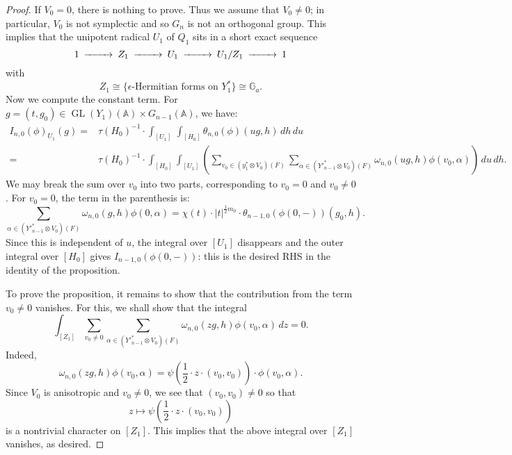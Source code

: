 \documentclass[10pt]{amsart}
\theoremstyle{plain}
\numberwithin{equation}{section}
\begin{document}
 \begin{proof}
 If $V_0 = 0$, there is nothing to prove. Thus we assume that $V_0 \ne
 0$; in particular, $V_0$ is not symplectic and so $G_n$ is not an
 orthogonal group.
 This implies that the unipotent radical $U_1$ of $Q_1$ sits in a
 short exact sequence
 \[  \begin{CD} 
 1 @>>> Z_1 @>>> U_1 @>>> U_1/Z_1 @>>> 1 \end{CD} \]
 with
 \[  Z_1 \cong \{ \text{$\epsilon$-Hermitian forms on $Y_1^*$} \} \cong \mathbb{G}_a. \]
Now  we compute the constant term. For $g = (t, g_0) \in {\operatorname{GL}}(Y_1)({\mathbb{A}})
\times G_{n-1}({\mathbb{A}})$, we have:
 \begin{align*} 
 I_{n,0}(\phi)_{U_1}(g) 
 = & \tau(H_0)^{-1} \cdot \int_{[U_1]} \, \int_{[H_0]} \theta_{n,0}(\phi)(ug, h) \, dh \, du  \\
 = & \tau(H_0)^{-1} \cdot \int_{[H_0]} \int_{[U_1]} \left( \sum_{v_0 \in (y_1^* \otimes V_0)(F)}
   \sum_{\alpha \in ({Y'}_{n-1}^* \otimes V_0)(F)}   \omega_{n,0}(ug, h)  \phi
   (v_0, \alpha)  \right) \, du \, dh.
 \end{align*}
 We may break the sum over $v_0$ into two parts, corresponding to $v_0
 = 0$ and $v_0 \ne 0$. 
 For $v_0 = 0$, the term in the parenthesis is:
 \[    \sum_{\alpha \in ({Y'}_{n-1}^* \otimes V_0)(F)} \omega_{n,0}(g,h)\phi(0,
 \alpha) = \chi(t) \cdot |t|^{\frac{1}{2} m_0} \cdot
 \theta_{n-1, 0}(\phi(0,-))(g_0, h). \]
Since this  is independent of $u$, the integral over $[U_1]$
disappears and the outer integral over $[H_0]$ gives
$I_{n-1,0}(\phi(0,-))$: this is the desired RHS in the identity of the
proposition.
 \vskip 5pt
 
 To prove the proposition, it remains to show that the contribution
 from the term $v_0 \ne 0$ vanishes. For this, we shall show that the
 integral
 \[  \int_{[Z_1]}  \sum_{v_0 \ne 0}  \sum_{\alpha  \in ({Y'}^*_{n-1}
   \otimes V_0)(F)}   \omega_{n,0}(zg, h)  \phi (v_0, \alpha)   \, dz  =
 0. \] 
 Indeed, 
 \[  \omega_{n,0}(zg, h)\phi(v_0, \alpha) 
= \psi(\frac{1}{2} \cdot z \cdot (v_0,v_0)) \cdot \phi(v_0, \alpha). \]
 Since $V_0$ is anisotropic and $v_0 \ne 0$, we see that $(v_0,v_0) \ne 0$ so that 
 \[  z \mapsto \psi(\frac{1}{2} \cdot z \cdot (v_0,v_0)) \]
 is a nontrivial character on $[Z_1]$. This implies that the above
 integral over $[Z_1]$ vanishes, as desired.
 \end{proof}
 
 \vskip 5pt
  
\end{document}
